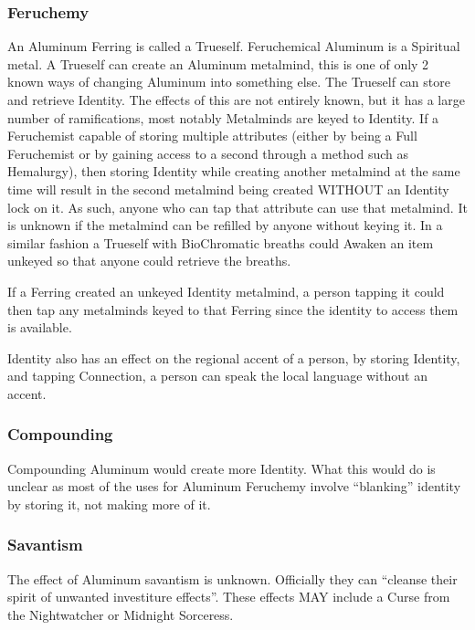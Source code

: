 \documentclass[conference]{IEEEtran}
\begin{document}
\subsubsection*{\textbf{Feruchemy}}
An Aluminum Ferring is called a Trueself.\cite{ARS}  Feruchemical Aluminum is a Spiritual metal.\cite{FE-TB}  A Trueself can create an Aluminum metalmind, this is one of only 2 known ways of changing Aluminum into something else.  The Trueself can store and retrieve Identity.\cite{ARS}  The effects of this are not entirely known, but it has a large number of ramifications, most notably  Metalminds are keyed to Identity.  If a Feruchemist capable of storing multiple attributes (either by being a Full Feruchemist or by gaining access to a second through a method such as Hemalurgy), then storing Identity while creating another metalmind at the same time will result in the second metalmind being created WITHOUT an Identity lock on it.  As such, anyone who can tap that attribute can use that metalmind.\cite{BoM-CH3}  It is unknown if the metalmind can be refilled by anyone without keying it.  In a similar fashion a Trueself with BioChromatic breaths could Awaken an item unkeyed so that anyone could retrieve the breaths.\cite{unkeyed-awake}

If a Ferring created an unkeyed Identity metalmind, a person tapping it could then tap any metalminds keyed to that Ferring since the identity to access them is available.\cite{HE-Fe-access}

Identity also has an effect on the regional accent of a person,\cite{identy-accent} by storing Identity, and tapping Connection,\cite{OB-CH65}\cite{BoM-CH22} a person can speak the local language without an accent.\cite{identy-accent}\\
\subsubsection*{\textbf{Compounding}}
Compounding Aluminum would create more Identity.  What this would do is unclear as most of the uses for Aluminum Feruchemy involve ``blanking'' identity by storing it, not making more of it.  \\
\subsubsection*{\textbf{Savantism}}
The effect of Aluminum savantism is unknown.  Officially they can ``cleanse their spirit of unwanted investiture effects''.\cite{al-savant}  These effects MAY include a Curse from the Nightwatcher\cite{WoK-I7} or Midnight Sorceress.\cite{ToES-CH13}\\
\end{document}

